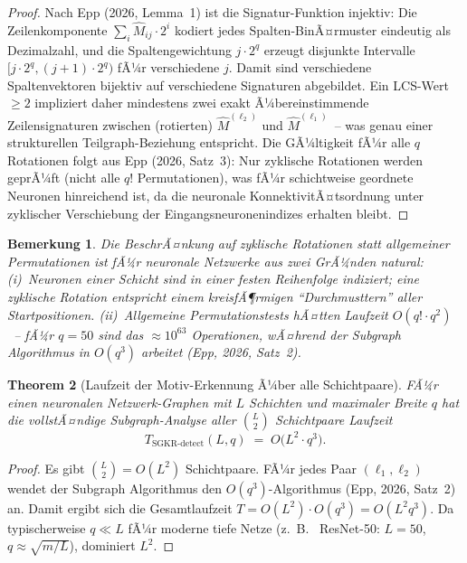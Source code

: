 ﻿\documentclass[12pt, a4paper, openany]{report}
\newtheorem{theorem}{Theorem}[chapter]
\newtheorem{remark}[theorem]{Bemerkung}
\begin{document}
\begin{proof}
Nach Epp (2026, Lemma~1) ist die Signatur-Funktion injektiv: Die
Zeilenkomponente $\sum_{i} \hat{M}_{ij} \cdot 2^i$ kodiert jedes
Spalten-BinÃ¤rmuster eindeutig als Dezimalzahl, und die Spaltengewichtung
$j \cdot 2^q$ erzeugt disjunkte Intervalle $[j\cdot 2^q, (j+1)\cdot 2^q)$
fÃ¼r verschiedene $j$.  Damit sind verschiedene Spalten\-vektoren
bijektiv auf verschiedene Signaturen abgebildet.  Ein
LCS-Wert $\geq 2$ impliziert daher mindestens zwei exakt Ã¼bereinstimmende
Zeilen\-signaturen zwischen (rotierten) $\hat{M}^{(\ell_2)}$ und
$\hat{M}^{(\ell_1)}$~-- was genau einer strukturellen Teilgraph-Beziehung
entspricht.  Die GÃ¼ltigkeit fÃ¼r alle $q$ Rotationen folgt aus Epp (2026,
Satz~3): Nur zyklische Rotationen werden geprÃ¼ft (nicht alle $q!$
Permutationen), was fÃ¼r schichtweise geordnete Neuronen hinreichend ist,
da die neuronale KonnektivitÃ¤tsordnung unter zyklischer Verschiebung
der Ein\-gangs\-neuronen\-indizes erhalten bleibt.
\end{proof}

\begin{remark}
Die BeschrÃ¤nkung auf zyklische Rotationen statt allgemeiner Permutationen
ist fÃ¼r neuronale Netzwerke aus zwei GrÃ¼nden natural: (i)~Neuronen
einer Schicht sind in einer festen Reihenfolge indiziert; eine zyklische
Rotation entspricht einem kreisfÃ¶rmigen ``Durchmusttern'' aller
Startpositionen.  (ii)~Allgemeine Permutationstests hÃ¤tten Laufzeit
$O(q! \cdot q^2)$~-- fÃ¼r $q = 50$ sind das $\approx 10^{63}$ Operationen,
wÃ¤hrend der Subgraph Algorithmus in $O(q^3)$ arbeitet
(Epp, 2026, Satz~2).
\end{remark}

\begin{theorem}[Laufzeit der Motiv-Erkennung Ã¼ber alle Schichtpaare]
\label{thm:motif_runtime}
FÃ¼r einen neuronalen Netzwerk-Graphen mit $L$ Schichten und maximaler
Breite $q$ hat die vollstÃ¤ndige Subgraph-Analyse aller $\binom{L}{2}$
Schicht\-paare Laufzeit
\begin{equation}
  \label{eq:motif_runtime}
  T_{\mathrm{SGKR\text{-}detect}}(L, q)
  \;=\; O\!\bigl(L^2 \cdot q^3\bigr).
\end{equation}
\end{theorem}

\begin{proof}
Es gibt $\binom{L}{2} = O(L^2)$ Schichtpaare.  FÃ¼r jedes Paar
$(\ell_1, \ell_2)$ wendet der Subgraph Algorithmus den
$O(q^3)$-Algorithmus (Epp, 2026, Satz~2) an.  Damit ergibt sich die
Gesamtlaufzeit $T = O(L^2) \cdot O(q^3) = O(L^2 q^3)$.  Da
typischerweise $q \ll L$ fÃ¼r moderne tiefe Netze (z.~B.~ ResNet-50:
$L = 50$, $q \approx \sqrt{m/L}$), dominiert $L^2$.
\end{proof}
\end{document}
